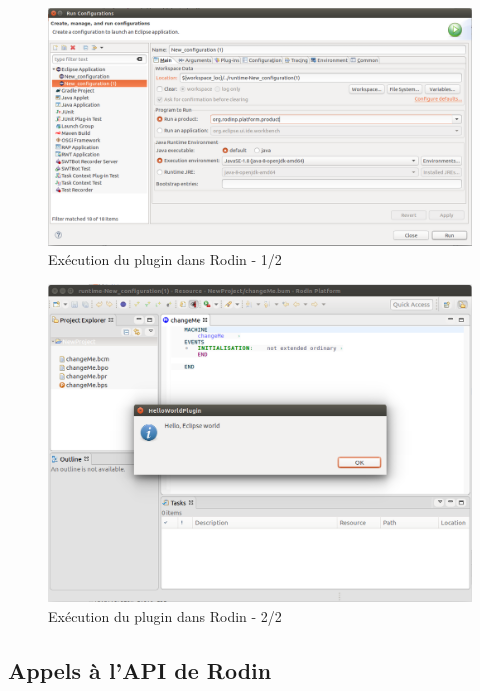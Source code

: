 \begin{figure}[H]
    \centering

    \includegraphics{pictures/runPlugin4.png}

    \caption{Exécution du plugin dans Rodin - 1/2}
    \label{fig:runPlugin3}
\end{figure}

\begin{figure}[H]
    \centering

    \includegraphics{pictures/runPlugin5.png}

    \caption{Exécution du plugin dans Rodin - 2/2}
    \label{fig:runPlugin4}
\end{figure}


\subsection{Appels à l'API de Rodin}

